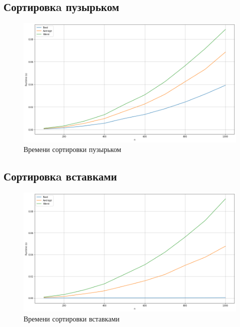 \pagebreak
\subsection*{Сортировкa пузырьком}
\begin{figure}[h!]
    \centering
    \includegraphics[width=1\textwidth]{3/inc/p1.png}
    \caption{Времени сортировки пузырьком}
\end{figure}

\subsection*{Сортировкa вставками}
\begin{figure}[h!]
    \centering
    \includegraphics[width=1\textwidth]{3/inc/p2.png}
    \caption{Времени сортировки вставками}
\end{figure}

